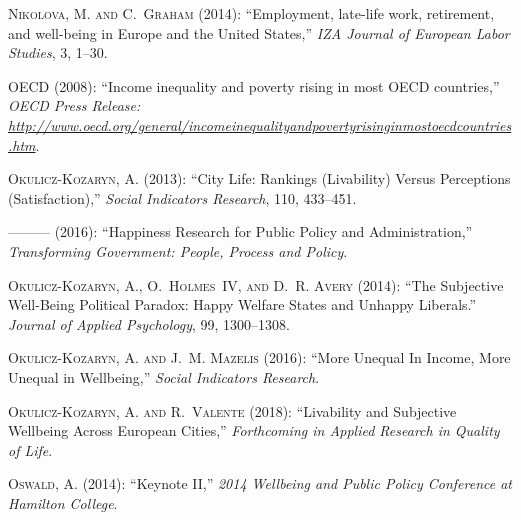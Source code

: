\documentclass[10pt, letterpaper]{article}
\begin{document}
\begin{spacing}{1.4}
\begin{thebibliography}{87}
\textsc{Nikolova, M. and C.~Graham} (2014): \enquote{Employment, late-life
  work, retirement, and well-being in Europe and the United States,} \emph{IZA
  Journal of European Labor Studies}, 3, 1--30.

\textsc{OECD} (2008): \enquote{Income inequality and poverty rising in most
  OECD countries,} \emph{OECD Press Release:
  \url{http://www.oecd.org/general/incomeinequalityandpovertyrisinginmostoecdcountries.htm}}.

\textsc{Okulicz-Kozaryn, A.} (2013): \enquote{City Life: Rankings (Livability)
  Versus Perceptions (Satisfaction),} \emph{Social Indicators Research}, 110,
  433--451.

---\hspace{-.1pt}---\hspace{-.1pt}--- (2016): \enquote{Happiness Research for
  Public Policy and Administration,} \emph{Transforming Government: People,
  Process and Policy}.

\textsc{Okulicz-Kozaryn, A., O.~Holmes~IV, and D.~R. Avery} (2014):
  \enquote{The Subjective Well-Being Political Paradox: Happy Welfare States
  and Unhappy Liberals.} \emph{Journal of Applied Psychology}, 99, 1300--1308.

\textsc{Okulicz-Kozaryn, A. and J.~M. Mazelis} (2016): \enquote{More Unequal In
  Income, More Unequal in Wellbeing,} \emph{Social Indicators Research}.

\textsc{Okulicz-Kozaryn, A. and R.~Valente} (2018): \enquote{Livability and
  Subjective Wellbeing Across European Cities,} \emph{Forthcoming in Applied
  Research in Quality of Life}.

\textsc{Oswald, A.} (2014): \enquote{Keynote II,} \emph{2014 Wellbeing and
  Public Policy Conference at Hamilton College}.


\end{thebibliography}
\end{spacing}
\end{document}
